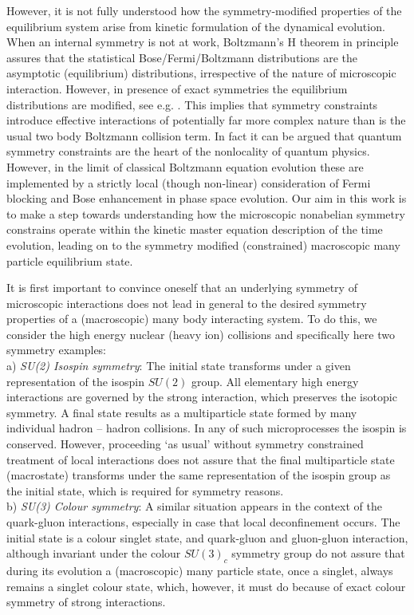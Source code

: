 \documentclass[a4paper,11pt]{article}
\begin{document}
However, it is not fully understood how the symmetry-modified
properties of the  equilibrium system arise from kinetic
formulation of the dynamical evolution.  When an internal symmetry
is not at work, Boltzmann's H theorem in principle assures that
the statistical Bose/Fermi/Boltzmann distributions are the
asymptotic (equilibrium) distributions, irrespective of the nature
of microscopic interaction. However, in presence of exact
symmetries the equilibrium distributions are modified, see e.g.
\cite{Turko,MullRaf}.  This implies that symmetry constraints
introduce effective interactions of potentially far more complex
nature than is the usual two body Boltzmann collision term. In
fact it can be argued that quantum symmetry constraints are the
heart of the nonlocality of quantum physics. However, in the limit
of classical Boltzmann equation evolution these are implemented by
a strictly local (though non-linear) consideration of Fermi
blocking and Bose enhancement in phase space evolution.  Our aim
in this work is to make a step towards understanding how the
microscopic  nonabelian symmetry constrains operate within the
kinetic master equation description of the time evolution, leading
on to the symmetry modified (constrained) macroscopic many
particle equilibrium state.

It is first important to convince oneself that an underlying
symmetry of microscopic interactions does not lead in general to
the desired symmetry properties of a (macroscopic) many body
interacting  system. To do this, we consider the high energy
nuclear (heavy ion) collisions and specifically here two
symmetry examples:\\

a) {\it SU(2) Isospin symmetry}: The initial state transforms
under a given representation of the isospin $SU(2)$ group. All
elementary high energy interactions are governed by the strong
interaction, which preserves the isotopic symmetry. A final state
results as a multiparticle state formed by many individual hadron
-- hadron collisions. In any of such microprocesses the isospin is
conserved. However, proceeding `as usual' without symmetry
constrained treatment of local interactions  does not assure that
the final multiparticle state (macrostate)  transforms under the
same representation of the isospin group as the initial state,
which is required for
symmetry reasons. \\

b) {\it SU(3) Colour symmetry}: A similar situation appears in the
context of the quark-gluon interactions, especially in case that
local deconfinement occurs. The initial state is a colour singlet
state, and  quark-gluon and gluon-gluon interaction, although
invariant under the colour $SU(3)_c$ symmetry group do not assure
that during its evolution a (macroscopic) many particle state,
once a singlet, always remains a singlet colour state, which,
however, it must do because
of exact colour symmetry of strong interactions.\\
\end{document}
